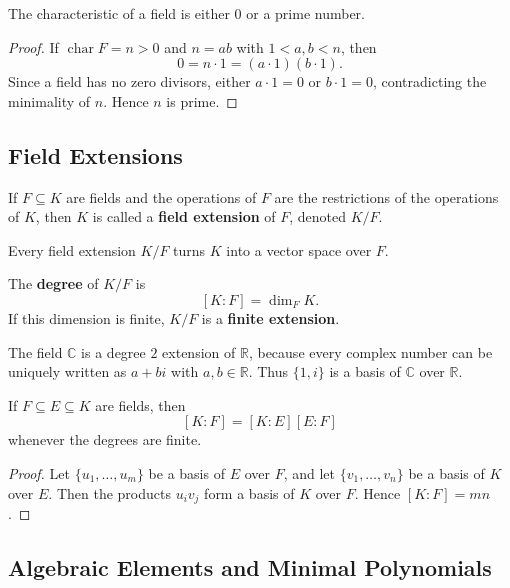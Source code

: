 \begin{proposition}
The characteristic of a field is either $0$ or a prime number.
\end{proposition}

\begin{proof}
If $\operatorname{char}F=n>0$ and $n=ab$ with $1<a,b<n$, then
\[
    0=n\cdot 1=(a\cdot 1)(b\cdot 1).
\]
Since a field has no zero divisors, either $a\cdot 1=0$ or $b\cdot 1=0$, contradicting the minimality of $n$. Hence $n$ is prime.
\end{proof}

\subsection{Field Extensions}

\begin{definition}
If $F\subseteq K$ are fields and the operations of $F$ are the restrictions of the operations of $K$, then $K$ is called a \textbf{field extension} of $F$, denoted $K/F$.
\end{definition}

Every field extension $K/F$ turns $K$ into a vector space over $F$.

\begin{definition}
The \textbf{degree} of $K/F$ is
\[
    [K:F]=\dim_F K.
\]
If this dimension is finite, $K/F$ is a \textbf{finite extension}.
\end{definition}

\begin{example}
The field $\mathbb{C}$ is a degree $2$ extension of $\mathbb{R}$, because every complex number can be uniquely written as $a+bi$ with $a,b\in\mathbb{R}$. Thus $\{1,i\}$ is a basis of $\mathbb{C}$ over $\mathbb{R}$.
\end{example}

\begin{theorem}
If $F\subseteq E\subseteq K$ are fields, then
\[
    [K:F]=[K:E][E:F]
\]
whenever the degrees are finite.
\end{theorem}

\begin{proof}
Let $\{u_1,\dots,u_m\}$ be a basis of $E$ over $F$, and let $\{v_1,\dots,v_n\}$ be a basis of $K$ over $E$. Then the products $u_i v_j$ form a basis of $K$ over $F$. Hence $[K:F]=mn$.
\end{proof}

\subsection{Algebraic Elements and Minimal Polynomials}

